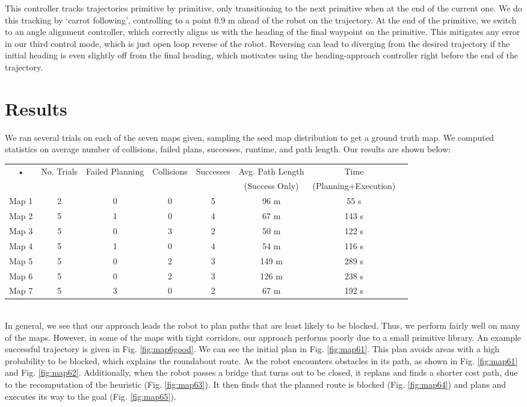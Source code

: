 \documentclass{article}
\begin{document}
This controller tracks trajectories primitive by primitive, only transitioning to the next primitive when at the end of the current one. We do this tracking by `carrot following', controlling to a point 0.9 m ahead of the robot on the trajectory. At the end of the primitive, we switch to an angle alignment controller, which correctly aligns us with the heading of the final waypoint on the primitive. This mitigates any error in our third control mode, which is just open loop reverse of the robot. Reversing can lead to diverging from the desired trajectory if the initial heading is even slightly off from the final heading, which motivates using the heading-approach controller right before the end of the trajectory.

\section{Results}

We ran several trials on each of the seven maps given, sampling the seed map distribution to get a ground truth map. We computed statistics on average number of collisions, failed plans, successes, runtime, and path length. Our results are shown below: 
\vspace{24pt}\\
\begin{tabular}{|c|c|c|c|c|c|c|c|}
\hline 
• & No. Trials & Failed Planning & Collisions & Successes & Avg. Path Length & Time  \\ 
&&&&&(Success Only)&(Planning+Execution)\\
\hline 
Map 1 & 2 & 0 & 0 & 5 & 96 m & 55 s \\ 
\hline 
Map 2 & 5 & 1 & 0 & 4 & 67 m & 143 s \\ 
\hline 
Map 3 & 5 & 0 & 3 & 2 & 50 m & 122 s\\ 
\hline 
Map 4 & 5 & 1 & 0 & 4 & 54 m & 116 s \\ 
\hline 
Map 5 & 5 & 0 & 2 & 3 & 149 m & 289 s \\ 
\hline 
Map 6 & 5 & 0 & 2 & 3 & 126 m & 238 s \\ 
\hline 
Map 7 & 5 & 3 & 0 & 2 & 67 m & 192 s \\ 
\hline 
\end{tabular} 
\vspace{24pt}
\\
In general, we see that our approach leads the robot to plan paths that are least likely to be blocked. Thus, we perform fairly well on many of the maps. However, in some of the maps with tight corridors, our approach performs poorly due to a small primitive library. An example successful trajectory is given in Fig. \ref{fig:map6good}. We can see the initial plan in Fig. \ref{fig:map61}. This plan avoids areas with a high probability to be blocked, which explains the roundabout route. As the robot encounters obstacles in its path, as shown in Fig. \ref{fig:map61} and Fig. \ref{fig:map62}. Additionally, when the robot passes a bridge that turns out to be closed, it replans and finds a shorter cost path, due to the recomputation of the heuristic (Fig. \ref{fig:map63}). It then finds that the planned route is blocked (Fig. \ref{fig:map64}) and plans and executes its way to the goal (Fig. \ref{fig:map65}).
\end{document}
